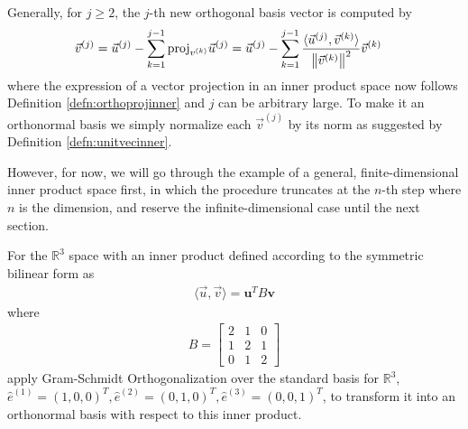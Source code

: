\begin{defn}
\begin{align}
\end{align}
Generally, for $j \geq 2$, the $j$-th new orthogonal basis vector is computed by
\begin{align}
\vec{v}^{(j)} &= \vec{u}^{(j)} - \sum_{k=1}^{j-1}\text{proj}_{v^{(k)}}\vec{u}^{(j)}  = \vec{u}^{(j)} - \sum_{k=1}^{j-1}\frac{\langle \vec{u}^{(j)}, \vec{v}^{(k)} \rangle}{\norm{\vec{v}^{(k)}}^2} \vec{v}^{(k)}
\end{align}
where the expression of a vector projection in an inner product space now follows Definition \ref{defn:orthoprojinner} and $j$ can be arbitrary large. To make it an orthonormal basis we simply normalize each $\vec{v}^{(j)}$ by its norm as suggested by Definition \ref{defn:unitvecinner}.  
\end{defn}
However, for now, we will go through the example of a general, finite-dimensional inner product space first, in which the procedure truncates at the $n$-th step where $n$ is the dimension, and reserve the infinite-dimensional case until the next section.
\begin{exmp}
\label{exmp:R3innerGS}
For the $\mathbb{R}^3$ space with an inner product defined according to the symmetric bilinear form as
\begin{align*}
\langle \vec{u}, \vec{v} \rangle = \textbf{u}^TB\textbf{v}
\end{align*}
where 
\begin{align*}
B =
\begin{bmatrix}
2&1&0\\ 
1&2&1\\
0&1&2
\end{bmatrix}
\end{align*}
apply Gram-Schmidt Orthogonalization over the standard basis for $\mathbb{R}^3$, $\hat{e}^{(1)} = (1,0,0)^T, \hat{e}^{(2)} = (0,1,0)^T, \hat{e}^{(3)} = (0,0,1)^T$, to transform it into an orthonormal basis with respect to this inner product.
\end{exmp}
